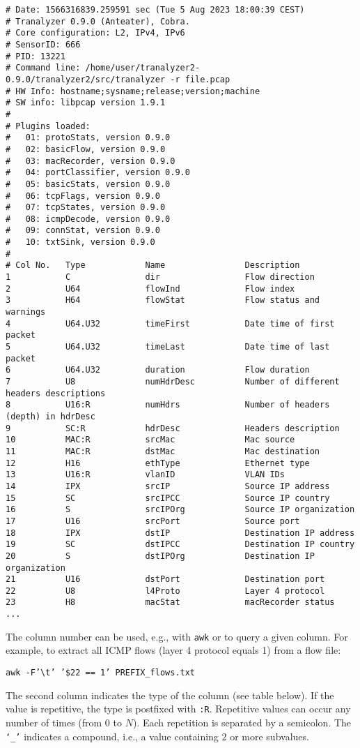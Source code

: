 \documentclass[documentation]{subfiles}
\begin{document}
\begin{lstlisting}
# Date: 1566316839.259591 sec (Tue 5 Aug 2023 18:00:39 CEST)
# Tranalyzer 0.9.0 (Anteater), Cobra.
# Core configuration: L2, IPv4, IPv6
# SensorID: 666
# PID: 13221
# Command line: /home/user/tranalyzer2-0.9.0/tranalyzer2/src/tranalyzer -r file.pcap
# HW Info: hostname;sysname;release;version;machine
# SW info: libpcap version 1.9.1
#
# Plugins loaded:
#   01: protoStats, version 0.9.0
#   02: basicFlow, version 0.9.0
#   03: macRecorder, version 0.9.0
#   04: portClassifier, version 0.9.0
#   05: basicStats, version 0.9.0
#   06: tcpFlags, version 0.9.0
#   07: tcpStates, version 0.9.0
#   08: icmpDecode, version 0.9.0
#   09: connStat, version 0.9.0
#   10: txtSink, version 0.9.0
#
# Col No.   Type            Name                Description
1           C               dir                 Flow direction
2           U64             flowInd             Flow index
3           H64             flowStat            Flow status and warnings
4           U64.U32         timeFirst           Date time of first packet
5           U64.U32         timeLast            Date time of last packet
6           U64.U32         duration            Flow duration
7           U8              numHdrDesc          Number of different headers descriptions
8           U16:R           numHdrs             Number of headers (depth) in hdrDesc
9           SC:R            hdrDesc             Headers description
10          MAC:R           srcMac              Mac source
11          MAC:R           dstMac              Mac destination
12          H16             ethType             Ethernet type
13          U16:R           vlanID              VLAN IDs
14          IPX             srcIP               Source IP address
15          SC              srcIPCC             Source IP country
16          S               srcIPOrg            Source IP organization
17          U16             srcPort             Source port
18          IPX             dstIP               Destination IP address
19          SC              dstIPCC             Destination IP country
20          S               dstIPOrg            Destination IP organization
21          U16             dstPort             Destination port
22          U8              l4Proto             Layer 4 protocol
23          H8              macStat             macRecorder status
...
\end{lstlisting}

The column number can be used, e.g., with {\tt awk} or  to query a given column.
For example, to extract all ICMP flows (layer 4 protocol equals 1) from a flow file:
\begin{center}
{\tt awk -F'\textbackslash{}t' '\$22 == 1' PREFIX\_flows.txt}
\end{center}
The second column indicates the type of the column (see table below).
If the value is repetitive, the type is postfixed with {\tt :R}.
Repetitive values can occur any number of times (from 0 to $N$).
Each repetition is separated by a semicolon.
The {\tt `\_'} indicates a compound, i.e., a value containing 2 or more subvalues.
\end{document}
